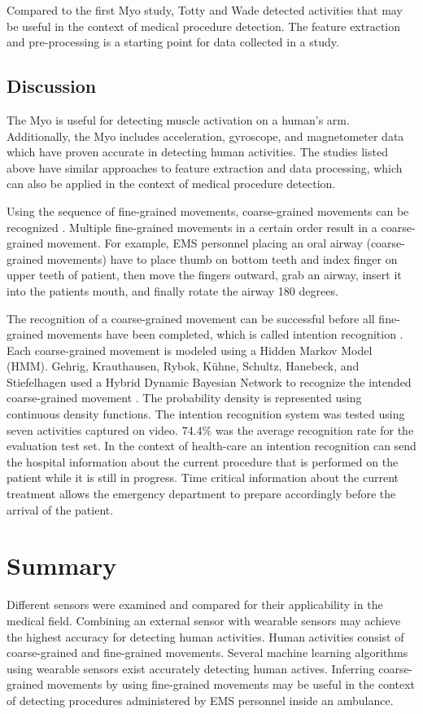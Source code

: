 \par Compared to the first Myo study, Totty and Wade detected activities that may be useful in the context of medical procedure detection. The feature extraction and pre-processing is a starting point for data collected in a study.
\subsection{Discussion}
The Myo is useful for detecting muscle activation on a human's arm. Additionally, the Myo includes acceleration, gyroscope, and magnetometer data which have proven accurate in detecting human activities. The studies listed above have similar approaches to feature extraction and data processing, which can also be applied in the context of medical procedure detection.
\par Using the sequence of fine-grained movements, coarse-grained movements can be recognized \cite{Dirk2010}. Multiple fine-grained movements in a certain order result in a coarse-grained movement. For example, EMS personnel placing an oral airway (coarse-grained movements) have to place thumb on bottom teeth and index finger on upper teeth of patient, then move the fingers outward, grab an airway, insert it into the patients mouth, and finally rotate the airway 180 degrees.
\par The recognition of a coarse-grained movement can be successful before all fine-grained movements have been completed, which is called intention recognition \cite{Schrempf2005}. Each coarse-grained movement is modeled using a Hidden Markov Model (HMM). Gehrig, Krauthausen, Rybok, K{\"{u}}hne, Schultz, Hanebeck, and Stiefelhagen used a Hybrid Dynamic Bayesian Network to recognize the intended coarse-grained movement \cite{Gehrig2011}. The probability density is represented using continuous density functions. The intention recognition system was tested using seven activities captured on video. 74.4\% was the average recognition rate for the evaluation test set. In the context of health-care an intention recognition can send the hospital information about the current procedure that is performed on the patient while it is still in progress. Time critical information about the current treatment allows the emergency department to prepare accordingly before the arrival of the patient.
\section{Summary}
\label{sec:Literature-Review:Summary}
Different sensors were examined and compared for their applicability in the medical field. Combining an external sensor with wearable sensors may achieve the highest accuracy for detecting human activities. Human activities consist of coarse-grained and fine-grained movements. Several machine learning algorithms using wearable sensors exist accurately detecting human actives. Inferring coarse-grained movements by using fine-grained movements may be useful in the context of detecting procedures administered by EMS personnel inside an ambulance. 